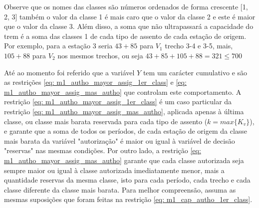 Observe que os nomes das classes são números ordenados de forma crescente [1, 2, 3] também o valor da classe 1 é mais caro que o valor da classe 2 e este é maior que o valor da classe 3. Além disso, a soma que não ultrapassará a capacidade do trem é a soma das classes 1 de cada tipo de assento de cada estação de origem. Por exemplo, para a estação 3 seria $43 + 85$ para $V_1$ trecho 3-4 e 3-5, mais, $105 + 88$ para $V_2$ nos mesmos trechos, ou seja $43 + 85 + 105 + 88 = 321 \leq 700$


Até ao momento foi referido que a variável $Y$ tem um carácter cumulativo e são as restrições \ref{eq: m1_autho_mayor_assig_1er_class} e \ref{eq: m1_autho_mayor_assig_mas_autho} que controlam este comportamento. A restrição \ref{eq: m1_autho_mayor_assig_1er_class} é um caso particular da restrição \ref{eq: m1_autho_mayor_assig_mas_autho}, aplicada apenas à última classe, ou classe mais barata reservada para cada tipo de assento ($k=max\{K_v\}$), e garante que a soma de todos os períodos, de cada estação de origem da classe mais barata da variável "autorização" é maior ou igual à variável de decisão "reservas" nas mesmas condições. Por outro lado, a restrição \ref{eq: m1_autho_mayor_assig_mas_autho} garante que cada classe autorizada seja sempre maior ou igual à classe autorizada imediatamente menor, mais a quantidade reservas da mesma classe, isto para cada período, cada trecho e cada classe diferente da classe mais barata. Para melhor compreensão, assuma as mesmas suposições que foram feitas na restrição \ref{eq: m1_cap_autho_1er_class}.


